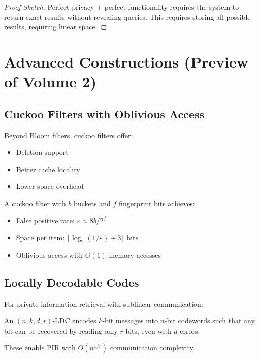 \begin{proof}[Proof Sketch]
Perfect privacy + perfect functionality requires the system to return exact results without revealing queries. This requires storing all possible results, requiring linear space.
\end{proof}

\section{Advanced Constructions (Preview of Volume 2)}

\subsection{Cuckoo Filters with Oblivious Access}

Beyond Bloom filters, cuckoo filters offer:
\begin{itemize}
\item Deletion support
\item Better cache locality
\item Lower space overhead
\end{itemize}

\begin{theorem}
A cuckoo filter with $b$ buckets and $f$ fingerprint bits achieves:
\begin{itemize}
\item False positive rate: $\varepsilon \approx 8b/2^f$
\item Space per item: $\lceil \log_2(1/\varepsilon) + 3 \rceil$ bits
\item Oblivious access with $O(1)$ memory accesses
\end{itemize}
\end{theorem}

\subsection{Locally Decodable Codes}

For private information retrieval with sublinear communication:

\begin{definition}
An $(n, k, d, r)$-LDC encodes $k$-bit messages into $n$-bit codewords such that any bit can be recovered by reading only $r$ bits, even with $d$ errors.
\end{definition}

These enable PIR with $O(n^{1/r})$ communication complexity.

